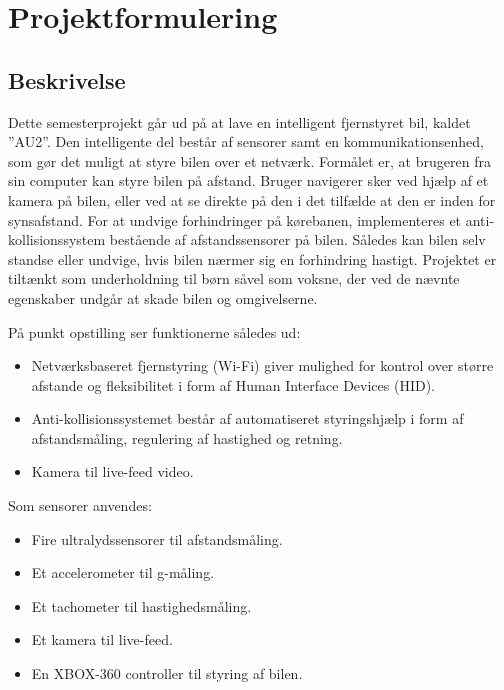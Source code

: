 \chapter{Projektformulering} \label{ch:projektformulering}


\section{Beskrivelse} \label{sec:beskrivelse}
Dette semesterprojekt går ud på at lave en intelligent fjernstyret bil, kaldet ”AU2”. Den intelligente del består af sensorer samt en kommunikationsenhed, som gør det muligt at styre bilen over et netværk. Formålet er, at brugeren fra sin computer kan styre bilen på afstand. Bruger navigerer sker ved hjælp af et kamera på bilen, eller ved at se direkte på den i det tilfælde at den er inden for synsafstand. For at undvige forhindringer på kørebanen, implementeres et anti-kollisionssystem bestående af afstandssensorer på bilen. Således kan bilen selv standse eller undvige, hvis bilen nærmer sig en forhindring hastigt. Projektet er tiltænkt som underholdning til børn såvel som voksne, der ved de nævnte egenskaber undgår at skade bilen og omgivelserne. 

På punkt opstilling ser funktionerne således ud:

\begin{itemize}\itemsep1pt \parskip0pt 
	\item Netværksbaseret fjernstyring (Wi-Fi) giver mulighed for kontrol over større afstande og fleksibilitet i form af Human Interface Devices (HID).
	\item Anti-kollisionssystemet består af automatiseret styringshjælp i form af
afstandsmåling, regulering af hastighed og retning.
	\item Kamera til live-feed video.
\end{itemize}

Som sensorer anvendes:

\begin{itemize}\itemsep1pt \parskip0pt 
	\item Fire ultralydssensorer til afstandsmåling.
	\item Et accelerometer til g-måling.
	\item Et tachometer til hastighedsmåling.
	\item Et kamera til live-feed.
	\item En XBOX-360 controller til styring af bilen.
\end{itemize}

